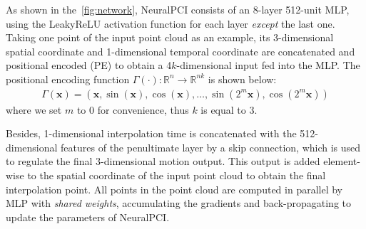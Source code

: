 \documentclass[10pt,twocolumn,letterpaper]{article}
\begin{document}
\begin{table}[t]
\renewcommand\arraystretch{1.1}
\centering
\caption{\textbf{Results with different layer depths  for NeuralPCI.} }
\label{tab:supp layer depth}
\end{table} 
As shown in the~\cref{fig:network}, NeuralPCI consists of an 8-layer 512-unit MLP, using the LeakyReLU activation function for each layer \textit{except} the last one. Taking one point of the input point cloud as an example, its 3-dimensional spatial coordinate and 1-dimensional temporal coordinate are concatenated and positional encoded (PE) to obtain a 4$\mathit{k}$-dimensional input fed into the MLP. The positional encoding function $\Gamma(\cdot): \mathbb{R} ^n \rightarrow \mathbb{R} ^{nk}$ is shown below:
\begin{equation}
\label{eq: PE}
\begin{split}
    \Gamma(\mathbf{x}) = \left( \mathbf{x} , \sin(\mathbf{x}), \cos(\mathbf{x}), \dots, \sin(2^{m} \mathbf{x}), \cos(2^{m} \mathbf{x}) \right)
\end{split}
\end{equation}
where we set $\mathit{m}$ to 0 for convenience, thus $\mathit{k}$ is equal to 3.

Besides, 1-dimensional interpolation time is concatenated with the 512-dimensional features of the penultimate layer by a skip connection, which is used to regulate the final 3-dimensional motion output. This output is added element-wise to the spatial coordinate of the input point cloud to obtain the final interpolation point. All points in the point cloud are computed in parallel by MLP with \textit{shared weights}, accumulating the gradients and back-propagating to update the parameters of NeuralPCI.
\end{document}
